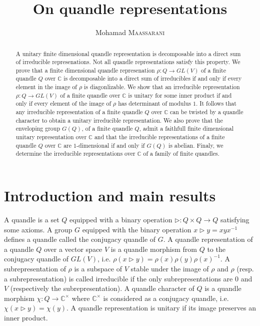 \documentclass[12pt, reqno]{amsart}
\begin{document}
 
\title{On quandle representations}

 


 
\author{Mohamad \textsc{Maassarani} }
\maketitle
\begin{abstract} A unitary finite dimensional quandle representation is decomposable into a direct sum of irreducible represenations. Not all quandle representations satisfy this property. We prove that a finite dimensional quandle represenation $\rho :Q \to GL(V) $ of a finite quandle $Q$ over $\mathbb{C}$ is decomposable into a direct sum of irreducibles if and only if every element in the image of $\rho$ is diagonlizable. We show that an irreducible representation $\rho :Q \to GL(V)$ of a finite quandle over $\mathbb{C}$ is unitary for some inner product if and only if every element of the image of $\rho$ has determinant of modulus $1$. It follows that any irreducible representation of a finite quandle $Q$ over $\mathbb{C}$ can be twisted by a quandle character to obtain a unitary irreducible representation. We also prove that the enveloping group $G(Q)$, of a finite quandle $Q$, admit a faithfull finite dimensional unitary representation over $\mathbb{C}$ and that the irreducible representations of a finite quandle $Q$ over $\mathbb{C}$ are $1$-dimensional if and only if $G(Q)$ is abelian. Finaly, we determine the irreducible representations over $\mathbb{C}$ of a family of finite quandles.
\end{abstract}
\section*{Introduction and main results}
A quandle is a set $Q$ equipped with a binary operation $\triangleright: Q\times Q \to Q$ satisfying some axioms. A group $G$ equipped with the binary operation $x\triangleright y=xyx^{-1}$ defines a quandle called the conjugacy quandle of $G$. A quandle representation of a quandle $Q$ over a vector space $V$ is a quandle morphism from $Q$ to the conjugacy quandle of $GL(V)$, i.e. $\rho(x\triangleright y)=\rho(x)\rho(y)\rho(x)^{-1}$. A subrepresentation of $\rho$ is a subspace of $V$ stable under the image of $\rho$ and $\rho$ (resp. a subrepresentation) is called irreducible if the only subrepresentations are $0$ and $V$ (respectively the subrepresentation). A quandle character of $Q$ is a quandle morphism $\chi : Q\to \mathbb{C}^\times$ where $\mathbb{C}^\times$ is considered as a conjugacy quandle, i.e. $\chi(x\triangleright y)=\chi (y)$. A quandle representation is unitary if its image preserves an inner product. 
\end{document}

